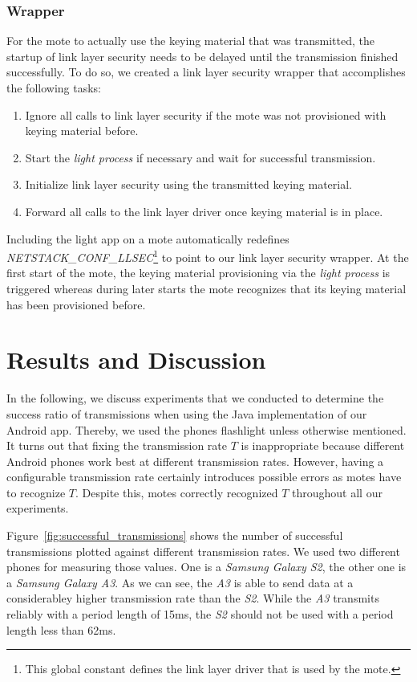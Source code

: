 \documentclass{sig-alternate} %
\begin{document}
\subsubsection{Wrapper}
\label{ssub:contiki_driver_wrapper}

For the mote to actually use the keying material that was transmitted, the startup of link layer security needs to be delayed until the transmission finished successfully.
To do so, we created a link layer security wrapper that accomplishes the following tasks:

\begin{enumerate}
	\item Ignore all calls to link layer security if the mote was not provisioned with keying material before.
	\item Start the \textit{light process} if necessary and wait for successful transmission.
	\item Initialize link layer security using the transmitted keying material.
	\item Forward all calls to the link layer driver once keying material is in place.
\end{enumerate}

Including the light app on a mote automatically redefines \textit{NETSTACK\_CONF\_LLSEC}\footnote{This global constant defines the link layer driver that is used by the mote.} to point to our link layer security wrapper.
At the first start of the mote, the keying material provisioning via the \textit{light process} is triggered whereas during later starts the mote recognizes that its keying material has been provisioned before.


\section{Results and Discussion}
\label{sec:results_and_discussion}

In the following, we discuss experiments that we conducted to determine the success ratio of transmissions when using the Java implementation of our Android app.
Thereby, we used the phones flashlight unless otherwise mentioned.
It turns out that fixing the transmission rate $T$ is inappropriate because different Android phones work best at different transmission rates. 
However, having a configurable transmission rate certainly introduces possible errors as motes have to recognize $T$. 
Despite this, motes correctly recognized $T$ throughout all our experiments.

Figure~\ref{fig:successful_transmissions} shows the number of successful transmissions plotted against different transmission rates.
We used two different phones for measuring those values.
One is a \textit{Samsung Galaxy S2}, the other one is a \textit{Samsung Galaxy A3}.
As we can see, the \textit{A3} is able to send data at a considerabley higher transmission rate than the \textit{S2}.
While the \textit{A3} transmits reliably with a period length of 15ms, the \textit{S2} should not be used with a period length less than 62ms.
\end{document}
